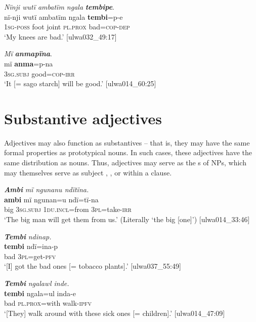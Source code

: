 \ea%
    \label{ex:adj:6}
            \textit{Nïnji wutï ambatïm ngala} \textbf{\textit{tembipe}}.\\
\gll nï-nji    wutï  ambatïm  ngala    \textbf{tembi}=p-e\\
    1\textsc{sg-poss}  foot  joint    \textsc{pl.prox}  bad=\textsc{cop-dep}\\
\glt `My knees are bad.’ [ulwa032\_49:17]
\z

\ea%
    \label{ex:adj:7}
            \textit{Mï} \textbf{\textit{anmapïna}}.\\
\gll mï      \textbf{anma}=p-na\\
    3\textsc{sg.subj}  good=\textsc{cop-irr}\\
\glt `It [= sago starch] will be good.’ [ulwa014\_60:25]
\z

\section{Substantive adjectives}\label{sec:5.3}


Adjectives may also function as substantives -- that is, they may have the same formal properties as prototypical nouns. In such cases, these adjectives have the same distribution as nouns. Thus, adjectives may serve as the s of NPs, which may themselves serve as subject ,  , or   within a clause.



\ea%
    \label{ex:adj:8}
            \textbf{\textit{Ambi}} \textit{mï ngunanu ndïtïna.}\\
\gll     \textbf{ambi}  mï      ngunan=u      ndï=tï-na\\
    big    3\textsc{sg.subj}  1\textsc{du.incl}=from  \textsc{3pl}=take-\textsc{irr}\\
\glt `The big man will get them from us.’ (Literally ‘the big [one]’) [ulwa014\_33:46] 
\z

\ea%
    \label{ex:adj:9}
            \textbf{\textit{Tembi}} \textit{ndinap.}\\
\gll    \textbf{tembi}  ndï=ina-p\\
    bad    3\textsc{pl}=get-\textsc{pfv}\\
\glt `[I] got the bad ones [= tobacco plants].’ [ulwa037\_55:49]
\z

\ea%
    \label{ex:adj:10}
          \textbf{\textit{Tembi}} \textit{ngalawl inde.}\\
\gll    \textbf{tembi}  ngala=ul    inda{}-e\\
    bad    \textsc{pl.prox}=with  walk-\textsc{ipfv}\\
\glt `[They] walk around with these sick ones [= children].’ [ulwa014\_47:09]
\z


